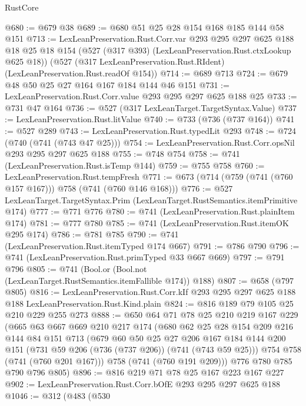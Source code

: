 \begin{lexlean}{RustCore}
\begin{coremodule}
@680 := @679 @38
@689 := @680 @51 @25 @28 @154 @168 @185 @144 @58 @151
@713 := LexLeanPreservation.Rust.Corr.var
    @293
    @295
    @297
    @625
    @188
    @18
    @25
    @18
    @154
    (@527 (@317 @393) (LexLeanPreservation.Rust.ctxLookup @625 @18))
    (@527 (@317 LexLeanPreservation.Rust.RIdent) (LexLeanPreservation.Rust.readOf @154))
@714 := @689 @713
@724 := @679 @48 @50 @25 @27 @164 @167 @184 @144 @46 @151
@731 := LexLeanPreservation.Rust.Corr.value @293 @295 @297 @625 @188 @25
@733 := @731 @47 @164
@736 := @527 (@317 LexLeanTarget.TargetSyntax.Value)
@737 := LexLeanPreservation.Rust.litValue
@740 := @733 (@736 (@737 @164))
@741 := @527 @289
@743 := LexLeanPreservation.Rust.typedLit @293
@748 := @724 (@740 (@741 (@743 @47 @25)))
@754 := LexLeanPreservation.Rust.Corr.opsNil @293 @295 @297 @625 @188
@755 := @748 @754
@758 := @741 (LexLeanPreservation.Rust.isTemp @144)
@759 := @755 @758
@760 := LexLeanPreservation.Rust.tempFresh
@771 := @673 (@714 (@759 (@741 (@760 @157 @167))) @758 (@741 (@760 @146 @168)))
@776 := @527 LexLeanTarget.TargetSyntax.Prim (LexLeanTarget.RustSemantics.itemPrimitive @174)
@777 := @771 @776
@780 := @741 (LexLeanPreservation.Rust.plainItem @174)
@781 := @777 @780
@785 := @741 (LexLeanPreservation.Rust.itemOK @295 @174)
@786 := @781 @785
@790 := @741 (LexLeanPreservation.Rust.itemTyped @174 @667)
@791 := @786 @790
@796 := @741 (LexLeanPreservation.Rust.primTyped @33 @667 @669)
@797 := @791 @796
@805 := @741 (Bool.or (Bool.not (LexLeanTarget.RustSemantics.itemFallible @174)) @188)
@807 := @658 (@797 @805)
@816 := LexLeanPreservation.Rust.Corr.kIf
    @293
    @295
    @297
    @625
    @188
    @188
    LexLeanPreservation.Rust.Kind.plain
@824 := @816 @189 @79 @105 @25 @210 @229 @255 @273
@888 := @650
    @64
    @71
    @78
    @25
    @210
    @219
    @167
    @229
    (@665
      @63
      @667
      @669
      @210
      @217
      @174
      (@680
        @62
        @25
        @28
        @154
        @209
        @216
        @144
        @84
        @151
        @713
        (@679
          @60
          @50
          @25
          @27
          @206
          @167
          @184
          @144
          @200
          @151
          (@731 @59 @206 (@736 (@737 @206)) (@741 (@743 @59 @25)))
          @754
          @758
          (@741 (@760 @201 @167)))
        @758
        (@741 (@760 @191 @209)))
      @776
      @780
      @785
      @790
      @796
      @805)
@896 := @816 @219 @71 @78 @25 @167 @223 @167 @227
@902 := LexLeanPreservation.Rust.Corr.bOfE @293 @295 @297 @625 @188
@1046 := @312
    (@483
      (@530

\end{coremodule}
\end{lexlean}
